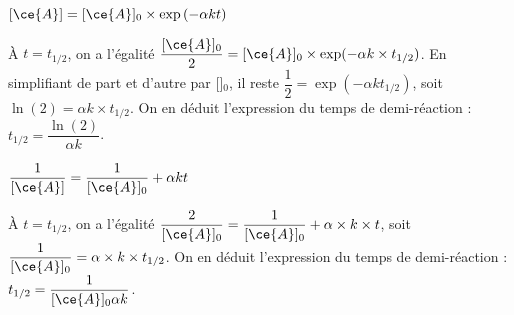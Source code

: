 \begin{enonce}
$[\ce{A}] = [\ce{A}]_0 \times \exp\left(- \alpha   k  t\right)$
\end{enonce}


\begin{corrige}
À $t=t_{1/2}$, on a l'égalité $\dfrac{[\ce{A}]_0}{2} = [\ce{A}]_0 \times  \exp(-\alpha k \times t_{1/2})$. En simplifiant de part et d'autre par []$_0$, il reste $\dfrac{1}{2} = \exp(-\alpha kt_{1/2})$, soit $\ln(2) = \alpha k \times t_{1/2}$. On en déduit l'expression du temps de demi-réaction : $t_{1/2} = \dfrac{\ln(2)}{\alpha k}$.
\end{corrige}



\begin{enonce}
$\dfrac{1}{[\ce{A}]} = \dfrac{1}{[\ce{A}]_0} + \alpha   k  t$
\end{enonce}


\begin{corrige}
À $t=t_{1/2}$, on a l'égalité $\dfrac{2}{[\ce{A}]_0} = \dfrac{1}{[\ce{A}]_0} + \alpha  \times k \times t$, soit $\dfrac{1}{[\ce{A}]_0} = \alpha  \times k \times t_{1/2}$. On en déduit l'expression du temps de demi-réaction : $t_{1/2} = \dfrac{1}{[\ce{A}]_0\alpha k}$.
\end{corrige}


\finEntrainement











